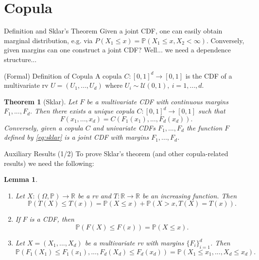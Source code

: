 \documentclass[envcountsect]{beamer}
\newcommand{\bR}{\mathbb{R}}
\newcommand{\bP}{\mathbb{P}}
\theoremstyle{definition}
\theoremstyle{plain}
\newtheorem{thm}[df]{Theorem}
\newtheorem{lem}[df]{Lemma}
\newcommand*{\udist}{\mathcal{U}(0,1)}
\begin{document}
\section{Copula}
\begin{frame}
	\tableofcontents[currentsection]
\end{frame}
\begin{frame}{Definition and Sklar's Theorem}
Given a joint CDF, one can easily obtain marginal distribution, e.g. via $P(X_1 \le x) = \bP(X_1\le x, X_2 < \infty)$. Conversely, given margins can one construct a joint CDF? Well... we need a dependence structure...

	\begin{block}{(Formal) Definition of Copula}
		A copula $C: [0,1]^d \rightarrow [0,1]$ is the CDF of a multivariate rv $U=(U_1,...,U_d)$ where $U_i \sim \udist,\ i=1,...,d$.
	\end{block}
\begin{thm}[Sklar]
	Let $F$ be a multivariate CDF with continuous margins $F_1,...,F_d$. Then there exists a unique copula $C: [0,1]^d \rightarrow [0,1]$ such that
	\begin{equation} \label{eq:sklar}
		F(x_1,..., x_d) = C(F_1(x_1),..., F_d(x_d)).
	\end{equation}
	Conversely, given a copula $C$ and univariate CDFs $F_1,..., F_d$ the function $F$ defined by \eqref{eq:sklar} is a joint CDF with margins $F_1,..., F_d$.
\end{thm}
\end{frame}
\begin{frame}{Auxiliary Results (1/2)}
To prove Sklar's theorem (and other copula-related results) we need the following:
	\begin{lem}\label{lem:geninv2}
		\begin{enumerate}
			\item \label{aux1} Let $X: (\Omega, \bP) \rightarrow \bR$ be a rv and $T: \bR \rightarrow \bR$ be an increasing function. Then
			\begin{equation} \label{eq:aux1}
				\bP(T(X)\le T(x)) = \bP(X\le x) + \bP(X>x, T(X)=T(x)).
			\end{equation}
			\item \label{aux2} If $F$ is a CDF, then
			\begin{equation} \label{eq:aux2}
				\bP(F(X)\le F(x)) = \bP(X\le x).
			\end{equation}
			\item  \label{aux3} Let $X=(X_1,...,X_d)$ be a multivariate rv with margins $\{F_i\}_{i=1}^d$. Then
			\begin{equation} \label{eq:aux3}
				\bP(F_1(X_1) \le F_1(x_1),..., F_d(X_d)\le F_d(x_d)) = \bP(X_1\le x_1,..., X_d\le x_d).
			\end{equation}
		\end{enumerate}
	\end{lem}
\end{frame}
\end{document}
